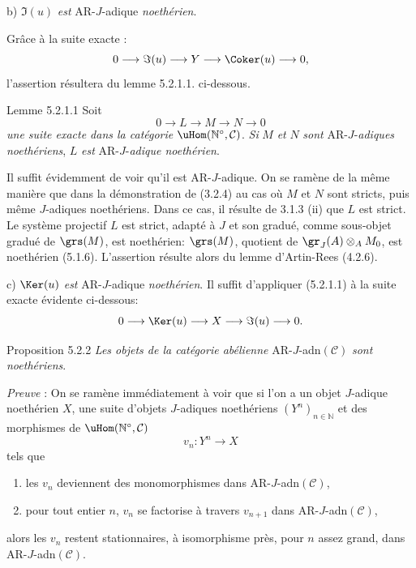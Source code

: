 b) \(\Im(u)\) \emph{est} AR-\(J\)-adique \emph{noethérien}.

Grâce à la suite exacte :
\[
0\longrightarrow \Im(u)\longrightarrow Y\longrightarrow \Coker(u)\longrightarrow 0,
\]
l'assertion résultera du lemme 5.2.1.1. ci-dessous.

\begin{statement}{Lemme 5.2.1.1}
Soit
\[
0\longrightarrow L\longrightarrow M\longrightarrow N\longrightarrow0
\]
\emph{une suite exacte dans la catégorie} \(\uHom(\mathbb{N}^\circ,\mathcal{C})\). \emph{Si} \(M\) \emph{et} \(N\) \emph{sont} AR-\(J\)-\emph{adiques noethériens}, \(L\) \emph{est} AR-\(J\)-\emph{adique noethérien}.
\end{statement}

Il suffit évidemment de voir qu'il est AR-\(J\)-adique. On se ramène de la même manière que dans la démonstration de (3.2.4) au cas où \(M\) et \(N\) sont stricts, puis même \(J\)-adiques noethériens. Dans ce cas, il résulte de 3.1.3 (ii) que \(L\) est strict. Le système projectif \(L\) est strict, adapté à \(J\) et son gradué, comme sous-objet gradué de \(\grs(M)\), est noethérien: \(\grs(M)\), quotient de \(\gr_J(A)\otimes_A M_0\), est noethérien (5.1.6). L'assertion résulte alors du lemme d'Artin-Rees (4.2.6).

c) \(\Ker(u)\) \emph{est} AR-\(J\)-adique \emph{noethérien}. Il suffit d'appliquer (5.2.1.1) à la suite exacte évidente ci-dessous:
\[
0\longrightarrow \Ker(u)\longrightarrow X\longrightarrow \Im(u)\longrightarrow0.
\]

\begin{statement}{Proposition 5.2.2}
\emph{Les objets de la catégorie abélienne} AR-\(J\)-adn\((\mathcal{C})\) \emph{sont noethériens}.
\end{statement}

\emph{Preuve} : On se ramène immédiatement à voir que si l'on a un objet \(J\)-adique noethérien \(X\), une suite d'objets \(J\)-adiques noethériens \((Y^n)_{n\in\mathbb{N}}\) et des morphismes de \(\uHom(\mathbb{N}^\circ,\mathcal{C})\)
\[
v_n:Y^n\longrightarrow X
\]
tels que
\begin{enumerate}[label=\textup{(\roman*)}]
\item les \(v_n\) deviennent des monomorphismes dans AR-\(J\)-adn\((\mathcal{C})\),
\item pour tout entier \(n\), \(v_n\) se factorise à travers \(v_{n+1}\) dans AR-\(J\)-adn\((\mathcal{C})\),
\end{enumerate}
alors les \(v_n\) restent stationnaires, à isomorphisme près, pour \(n\) assez grand, dans AR-\(J\)-adn\((\mathcal{C})\).

